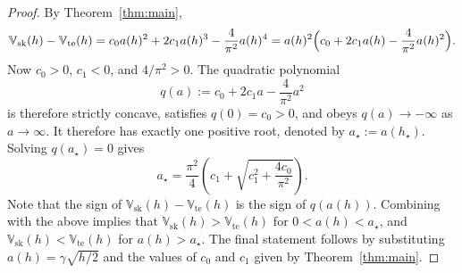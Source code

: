 \documentclass[11pt]{article}
\begin{document}
\begin{proof}
By Theorem~\ref{thm:main},
\[
\mathbb{V}_{\mathrm{sk}}(h)-\mathbb{V}_{\mathrm{te}}(h)
=
c_0 a(h)^2 + 2c_1 a(h)^3 - \frac{4}{\pi^2}a(h)^4
=
a(h)^2\Bigl(c_0 + 2c_1 a(h) - \frac{4}{\pi^2}a(h)^2\Bigr).
\]
Now $c_0>0$, $c_1<0$, and $4/\pi^2>0$. The quadratic polynomial
\[
q(a):=c_0 + 2c_1 a - \frac{4}{\pi^2}a^2
\]
is therefore strictly concave, satisfies $q(0)=c_0>0$, and obeys $q(a)\to -\infty$ as $a\to\infty$. It therefore has exactly one positive root, denoted by $a_\star:= a(h_\star)$. Solving $q(a_\star)=0$ gives
\[
a_\star
=
\frac{\pi^2}{4}
\left(
c_1 + \sqrt{c_1^2 + \frac{4c_0}{\pi^2}}
\right).
\]
Note that the sign of $\mathbb{V}_{\mathrm{sk}}(h)-\mathbb{V}_{\mathrm{te}}(h)$ is the sign of $q(a(h))$. Combining with the above implies that 
$\mathbb{V}_{\mathrm{sk}}(h)>\mathbb{V}_{\mathrm{te}}(h)$
for $0<a(h)<a_\star$,
and
$\mathbb{V}_{\mathrm{sk}}(h)<\mathbb{V}_{\mathrm{te}}(h)$
for $a(h)>a_\star$.
The final statement follows by substituting $a(h)=\gamma\sqrt{h/2}$ and the values of $c_0$ and $c_1$ given by Theorem~\ref{thm:main}.
\end{proof} 






\end{document}
